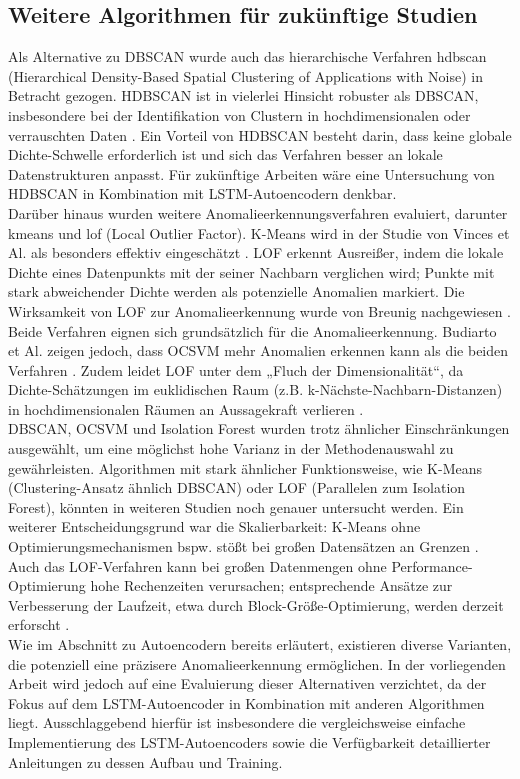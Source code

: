\documentclass[a4paper,12pt]{article}
\begin{document}
	\subsection{Weitere Algorithmen für zukünftige Studien }
	Als Alternative zu DBSCAN wurde auch das hierarchische Verfahren \gls{hdbscan} (Hierarchical Density-Based Spatial Clustering of Applications with Noise) in Betracht gezogen. HDBSCAN ist in vielerlei Hinsicht robuster als DBSCAN, insbesondere bei der Identifikation von Clustern in hochdimensionalen oder verrauschten Daten \cite{campello2015hierarchical}. Ein Vorteil von HDBSCAN besteht darin, dass keine globale Dichte-Schwelle erforderlich ist und sich das Verfahren besser an lokale Datenstrukturen anpasst. Für zukünftige Arbeiten wäre eine Untersuchung von HDBSCAN in Kombination mit LSTM-Autoencodern denkbar.
	\\[0.5em]
	Darüber hinaus wurden weitere Anomalieerkennungsverfahren evaluiert, darunter \gls{kmeans} und \gls{lof} (Local Outlier Factor). K-Means wird in der Studie von Vinces et Al. als besonders effektiv eingeschätzt \cite{vinces2025comparative}. LOF erkennt Ausreißer, indem die lokale Dichte eines Datenpunkts mit der seiner Nachbarn verglichen wird; Punkte mit stark abweichender Dichte werden als potenzielle Anomalien markiert. Die Wirksamkeit von LOF zur Anomalieerkennung wurde von Breunig nachgewiesen \cite{breunig2000lof}.
	\\[0.5em]
	Beide Verfahren eignen sich grundsätzlich für die Anomalieerkennung. Budiarto et Al. zeigen jedoch, dass OCSVM mehr Anomalien erkennen kann als die beiden Verfahren \cite{budiarto2025unsupervised}. Zudem leidet LOF unter dem „Fluch der Dimensionalität“, da Dichte-Schätzungen im euklidischen Raum (z.B. k-Nächste-Nachbarn-Distanzen) in hochdimensionalen Räumen an Aussagekraft verlieren \cite[S.366]{zimek2012survey}. 
	\\[0.5em]
	DBSCAN, OCSVM und Isolation Forest wurden trotz ähnlicher Einschränkungen ausgewählt, um eine möglichst hohe Varianz in der Methodenauswahl zu gewährleisten. Algorithmen mit stark ähnlicher Funktionsweise, wie K-Means (Clustering-Ansatz ähnlich DBSCAN) oder LOF (Parallelen zum Isolation Forest), könnten in weiteren Studien noch genauer untersucht werden. Ein weiterer Entscheidungsgrund war die Skalierbarkeit: K-Means ohne Optimierungsmechanismen bspw. stößt bei großen Datensätzen an Grenzen \cite{mussabayev2023kmeans}.
	\\[0.5em]
	Auch das LOF-Verfahren kann bei großen Datenmengen ohne Performance-Optimierung hohe Rechenzeiten verursachen; entsprechende Ansätze zur Verbesserung der Laufzeit, etwa durch Block-Größe-Optimierung, werden derzeit erforscht \cite{springerlof2023}.
	\\[0.5em]
	Wie im Abschnitt zu Autoencodern bereits erläutert, existieren diverse Varianten, die potenziell eine präzisere Anomalieerkennung ermöglichen. In der vorliegenden Arbeit wird jedoch auf eine Evaluierung dieser Alternativen verzichtet, da der Fokus auf dem LSTM-Autoencoder in Kombination mit anderen Algorithmen liegt. Ausschlaggebend hierfür ist insbesondere die vergleichsweise einfache Implementierung des LSTM-Autoencoders sowie die Verfügbarkeit detaillierter Anleitungen zu dessen Aufbau und Training.
\end{document}
